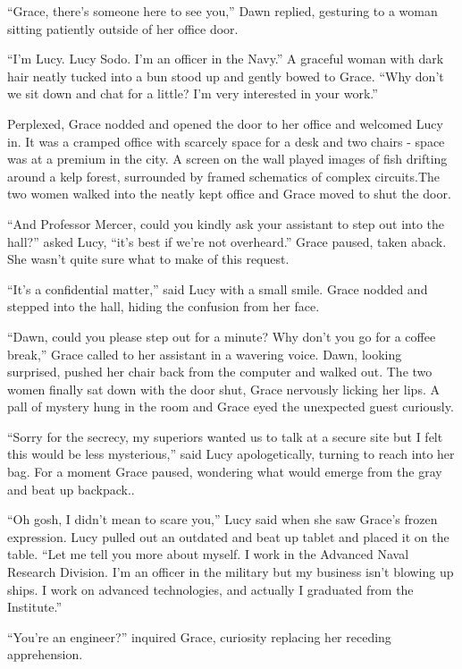 \documentclass[openany, 12pt]{book} %
\begin{document}
``Grace, there's someone here to see you,'' Dawn replied, gesturing to a woman sitting patiently outside of her office door.

``I'm Lucy. Lucy Sodo. I'm an officer in the Navy.'' A graceful woman with dark hair neatly tucked into a bun stood up and gently bowed to Grace. ``Why don't we sit down and chat for a little? I'm very interested in your work.''

Perplexed, Grace nodded and opened the door to her office and welcomed Lucy in. It was a cramped office with scarcely space for a desk and two chairs - space was at a premium in the city. A screen on the wall played images of fish drifting around a kelp forest, surrounded by framed schematics of complex circuits.The two women walked into the neatly kept office and Grace moved to shut the door.

``And Professor Mercer, could you kindly ask your assistant to step out into the hall?'' asked Lucy, ``it's best if we're not overheard.'' Grace paused, taken aback. She wasn't quite sure what to make of this request.

``It's a confidential matter,'' said Lucy with a small smile. Grace nodded and stepped into the hall, hiding the confusion from her face.

``Dawn, could you please step out for a minute? Why don't you go for a coffee break,'' Grace called to her assistant in a wavering voice. Dawn, looking surprised, pushed her chair back from the computer and walked out. The two women finally sat down with the door shut, Grace nervously licking her lips. A pall of mystery hung in the room and Grace eyed the unexpected guest curiously.

``Sorry for the secrecy, my superiors wanted us to talk at a secure site but I felt this would be less mysterious,'' said Lucy apologetically, turning to reach into her bag. For a moment Grace paused, wondering what would emerge from the gray and beat up backpack..

``Oh gosh, I didn't mean to scare you,'' Lucy said when she saw Grace's frozen expression. Lucy pulled out an outdated and beat up tablet and placed it on the table. ``Let me tell you more about myself. I work in the Advanced Naval Research Division. I'm an officer in the military but my business isn't blowing up ships. I work on advanced technologies, and actually I graduated from the Institute.''

``You're an engineer?'' inquired Grace, curiosity replacing her receding apprehension.
\end{document}

